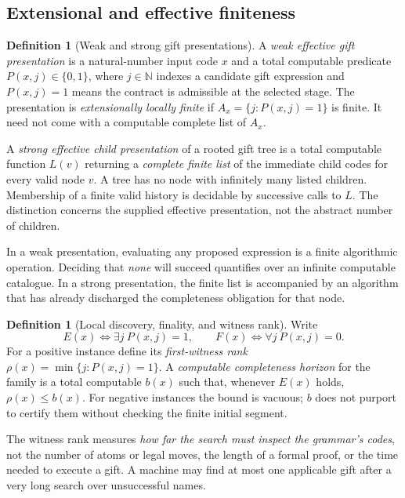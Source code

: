 \documentclass[11pt,letterpaper]{article}
\theoremstyle{definition}\newtheorem{definition}[theorem]{Definition}\newtheorem{example}[theorem]{Example}
\theoremstyle{remark}\newtheorem{remark}[theorem]{Remark}
\begin{document}
\subsection{Extensional and effective finiteness}
\begin{definition}[Weak and strong gift presentations]\label{w3:def:presentations}
A \emph{weak effective gift presentation} is a natural-number input code $x$ and a total computable predicate $P(x,j)\in\{0,1\}$, where $j\in\mathbb N$ indexes a candidate gift expression and $P(x,j)=1$ means the contract is admissible at the selected stage. The presentation is \emph{extensionally locally finite} if $A_x=\{j:P(x,j)=1\}$ is finite. It need not come with a computable complete list of $A_x$.

A \emph{strong effective child presentation} of a rooted gift tree is a total computable function $L(v)$ returning a \emph{complete finite list} of the immediate child codes for every valid node $v$. A tree has no node with infinitely many listed children. Membership of a finite valid history is decidable by successive calls to $L$. The distinction concerns the supplied effective presentation, not the abstract number of children.
\end{definition}

In a weak presentation, evaluating any proposed expression is a finite algorithmic operation. Deciding that \emph{none} will succeed quantifies over an infinite computable catalogue. In a strong presentation, the finite list is accompanied by an algorithm that has already discharged the completeness obligation for that node.

\begin{definition}[Local discovery, finality, and witness rank]\label{w3:def:rank}
Write
\[
 E(x)\iff\exists j\ P(x,j)=1,\qquad F(x)\iff\forall j\ P(x,j)=0.
\]
For a positive instance define its \emph{first-witness rank} $\rho(x)=\min\{j:P(x,j)=1\}$. A \emph{computable completeness horizon} for the family is a total computable $b(x)$ such that, whenever $E(x)$ holds, $\rho(x)\le b(x)$. For negative instances the bound is vacuous; $b$ does not purport to certify them without checking the finite initial segment.
\end{definition}

The witness rank measures \emph{how far the search must inspect the grammar's codes}, not the number of atoms or legal moves, the length of a formal proof, or the time needed to execute a gift. A machine may find at most one applicable gift after a very long search over unsuccessful names.
\end{document}
